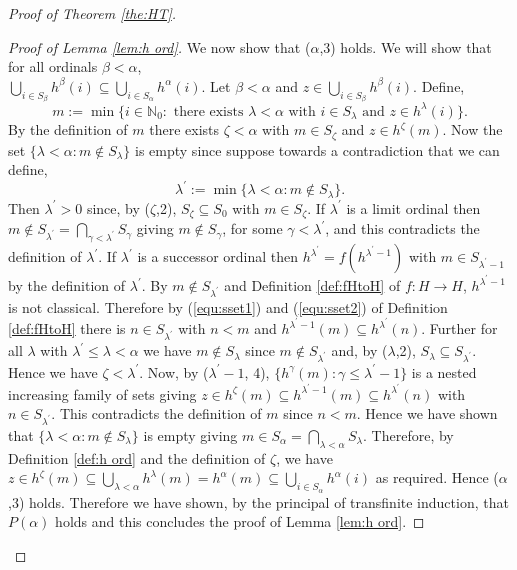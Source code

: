 \documentclass{strippedproc-l}
\theoremstyle{definition}
\theoremstyle{remark}
\numberwithin{equation}{section}
\begin{document}
\begin{proof}[Proof of Theorem \ref{the:HT}]
\begin{proof}[Proof of Lemma \ref{lem:h ord}]
We now show that ($\alpha$,3) holds. We will show that for all ordinals $\beta<\alpha$,\\ $\bigcup_{i\in S_{\beta}}h^{\beta}(i)\subseteq\bigcup_{i\in S_{\alpha}}h^{\alpha}(i)$. Let $\beta<\alpha$ and $z\in\bigcup_{i\in S_{\beta}}h^{\beta}(i)$. Define,
\begin{equation*}
m:=\min\{i\in\mathbb{N}_{0}:\mbox{ there exists }\lambda<\alpha\mbox{ with } i\in S_{\lambda}\mbox{ and }z\in h^{\lambda}(i)\}.
\end{equation*}
By the definition of $m$ there exists $\zeta<\alpha$ with $m\in S_{\zeta}$ and $z\in h^{\zeta}(m)$. Now the set $\{\lambda<\alpha:m\not\in S_{\lambda}\}$ is empty since suppose towards a contradiction that we can define,
\begin{equation*}
\lambda^{'}:=\min\{\lambda<\alpha:m\not\in S_{\lambda}\}.
\end{equation*}
Then $\lambda^{'}>0$ since, by ($\zeta$,2), $S_{\zeta}\subseteq S_{0}$ with $m\in S_{\zeta}$. If $\lambda^{'}$ is a limit ordinal then $m\not\in S_{\lambda^{'}}=\bigcap_{\gamma<\lambda^{'}}S_{\gamma}$ giving $m\not\in S_{\gamma}$, for some $\gamma<\lambda^{'}$, and this contradicts the definition of $\lambda^{'}$. If $\lambda^{'}$ is a successor ordinal then $h^{\lambda^{'}}=f(h^{\lambda^{'}-1})$ with $m\in S_{\lambda^{'}-1}$ by the definition of $\lambda^{'}$. By $m\not\in S_{\lambda^{'}}$ and Definition \ref{def:fHtoH} of $f:H\rightarrow H$, $h^{\lambda^{'}-1}$ is not classical. Therefore by (\ref{equ:sset1}) and (\ref{equ:sset2}) of Definition \ref{def:fHtoH} there is $n\in S_{\lambda^{'}}$ with $n<m$ and $h^{\lambda^{'}-1}(m)\subseteq h^{\lambda^{'}}(n)$. Further for all $\lambda$ with $\lambda^{'}\le\lambda<\alpha$ we have $m\not\in S_{\lambda}$ since $m\not\in S_{\lambda^{'}}$ and, by ($\lambda$,2), $S_{\lambda}\subseteq S_{\lambda^{'}}$. Hence we have $\zeta<\lambda^{'}$. Now, by ($\lambda^{'}-1$, 4), $\{h^{\gamma}(m):\gamma\le\lambda^{'}-1\}$ is a nested increasing family of sets giving $z\in h^{\zeta}(m)\subseteq h^{\lambda^{'}-1}(m)\subseteq h^{\lambda^{'}}(n)$ with $n\in S_{\lambda^{'}}$. This contradicts the definition of $m$ since $n<m$. Hence we have shown that $\{\lambda<\alpha:m\not\in S_{\lambda}\}$ is empty giving $m\in S_{\alpha}=\bigcap_{\lambda<\alpha}S_{\lambda}$. Therefore, by Definition \ref{def:h ord} and the definition of $\zeta$, we have $z\in h^{\zeta}(m)\subseteq\bigcup_{\lambda<\alpha}h^{\lambda}(m)=h^{\alpha}(m)\subseteq\bigcup_{i\in S_{\alpha}}h^{\alpha}(i)$ as required. Hence ($\alpha$,3) holds. Therefore we have shown, by the principal of transfinite induction, that $P(\alpha)$ holds and this concludes the proof of Lemma \ref{lem:h ord}.

\end{proof}
\end{proof}
\end{document}

